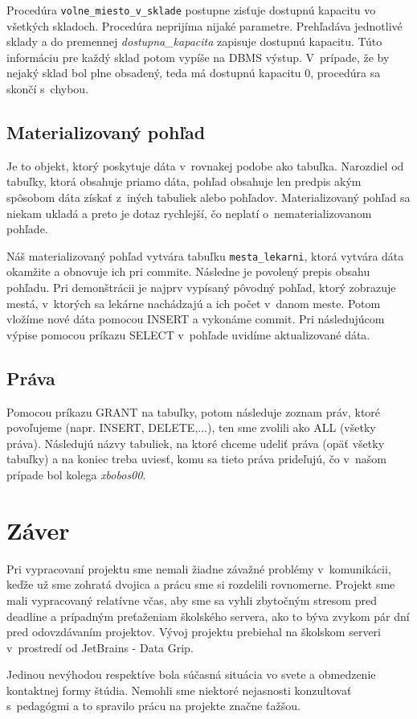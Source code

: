 \documentclass[a4paper, 11pt]{article}
\begin{document}
	Procedúra \texttt{volne\_miesto\_v\_sklade} postupne zisťuje dostupnú kapacitu vo všetkých skladoch. Procedúra neprijíma nijaké parametre. Prehľadáva jednotlivé sklady a do premennej \emph{dostupna\_kapacita} zapisuje dostupnú kapacitu. Túto informáciu pre každý sklad potom vypíše na DBMS výstup. V~prípade, že by nejaký sklad bol plne obsadený, teda má dostupnú kapacitu 0, procedúra sa skončí s~chybou.

	\subsection{Materializovaný pohľad}
	Je to objekt, ktorý poskytuje dáta v~rovnakej podobe ako tabuľka. Narozdiel od tabuľky, ktorá obsahuje priamo dáta, pohľad obsahuje len predpis akým spôsobom dáta získať z~iných tabuliek alebo pohľadov. Materializovaný pohľad sa niekam ukladá a preto je dotaz rychlejší, čo neplatí o~nematerializovanom pohľade. \\
	\par Náš materializovaný pohľad vytvára tabuľku \texttt{mesta\_lekarni}, ktorá vytvára dáta okamžite a obnovuje ich pri commite. Následne je povolený prepis obsahu pohľadu. Pri demonštrácii je najprv vypísaný pôvodný pohľad, ktorý zobrazuje mestá, v~ktorých sa lekárne nachádzajú a ich počet v~danom meste. Potom vložíme nové dáta pomocou INSERT a vykonáme commit. Pri následujúcom výpise pomocou príkazu SELECT v~pohľade uvidíme aktualizované dáta.

	\subsection{Práva}
	Pomocou príkazu GRANT na tabuľky, potom následuje zoznam práv, ktoré povoľujeme (napr. INSERT, DELETE,...), ten sme zvolili ako ALL (všetky práva). Následujú názvy tabuliek, na ktoré chceme udeliť práva (opäť všetky tabuľky) a na koniec treba uviesť, komu sa tieto práva prideľujú, čo v~našom prípade bol kolega \textit{xbobos00}.

	\section{Záver}
	Pri vypracovaní projektu sme nemali žiadne závažné problémy v~komunikácii, keďže už sme zohratá dvojica a prácu sme si rozdelili rovnomerne. Projekt sme mali vypracovaný relatívne včas, aby sme sa vyhli zbytočným stresom pred deadline a prípadným preťaženiam školského servera, ako to býva zvykom pár dní pred odovzdávaním projektov. Vývoj projektu prebiehal na školskom serveri v~prostredí od JetBrains \-- Data Grip.
	\par Jedinou nevýhodou respektíve  bola súčasná situácia vo svete a obmedzenie kontaktnej formy štúdia. Nemohli sme niektoré nejasnosti konzultovať s~pedagógmi a to spravilo prácu na projekte značne ťažšou.
\end{document}
